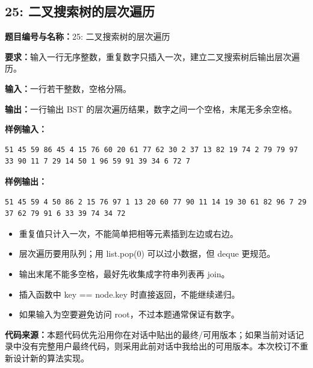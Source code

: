 \documentclass[10pt,a4paper,fontset=none]{ctexart}
\newcommand{\codesource}{\par\noindent\textbf{代码来源：}本题代码优先沿用你在对话中贴出的最终/可用版本；如果当前对话记录中没有完整用户最终代码，则采用此前对话中我给出的可用版本。本次校订不重新设计新的算法实现。\par\vspace{0.2em}}
\begin{document}
\subsection{25: 二叉搜索树的层次遍历}
\begin{taskbox}
\textbf{题目编号与名称：}25: 二叉搜索树的层次遍历\par
\textbf{要求：}输入一行无序整数，重复数字只插入一次，建立二叉搜索树后输出层次遍历。\par
\textbf{输入：}一行若干整数，空格分隔。\par
\textbf{输出：}一行输出 BST 的层次遍历结果，数字之间一个空格，末尾无多余空格。\par
\textbf{样例输入：}
\begin{lstlisting}[style=sample]
51 45 59 86 45 4 15 76 60 20 61 77 62 30 2 37 13 82 19 74 2 79 79 97 33 90 11 7 29 14 50 1 96 59 91 39 34 6 72 7
\end{lstlisting}
\textbf{样例输出：}
\begin{lstlisting}[style=sample]
51 45 59 4 50 86 2 15 76 97 1 13 20 60 77 90 11 14 19 30 61 82 96 7 29 37 62 79 91 6 33 39 74 34 72
\end{lstlisting}
\end{taskbox}
\begin{mistakebox}
\begin{itemize}
  \item 重复值只计入一次，不能简单把相等元素插到左边或右边。
  \item 层次遍历要用队列；用 list.pop(0) 可以过小数据，但 deque 更规范。
  \item 输出末尾不能多空格，最好先收集成字符串列表再 join。
  \item 插入函数中 key == node.key 时直接返回，不能继续递归。
  \item 如果输入为空要避免访问 root，不过本题通常保证有数字。
\end{itemize}
\end{mistakebox}
\codesource
\end{document}

